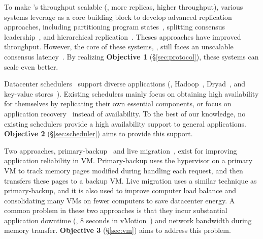 To make \paxos's throughput scalable (\ie, more replicas, higher throughput), 
various systems leverage \paxos as a core building block to develop advanced 
replication approaches, including partitioning program 
states~\cite{scatter:sosp11,ssmr:dsn14}, splitting consensus 
leadership~\cite{mencius:osdi08,spaxos:srds12}, and hierarchical 
replication~\cite{manos:hotdep10,scatter:sosp11}. Theses approaches have 
improved throughput. However, the core of these systems, 
\paxos, still faces an unscalable consensus 
latency~\cite{ellis:thesis,scatter:sosp11,manos:hotdep10}. By realizing 
\textbf{Objective 1} (\S\ref{sec:protocol}), these systems can scale even 
better.

 Datacenter
schedulers~\cite{borg:eurosys15,mesos:nsdi11,tupperware,yarn:socc13,
autopilot:sosp07,quincy:sosp09,apollo:osdi14,fuxi:vldb14} support diverse 
applications (\eg, Hadoop~\cite{hadoop}, Dryad~\cite{dryad}, and key-value 
stores~\cite{redis}). Existing schedulers mainly focus on obtaining high 
availability for themselves by replicating their own essential components, or 
focus on application recovery~\cite{fuxi:vldb14} instead of availability. 
To the best of our knowledge, no existing schedulers provide a
high availability support to general applications. \textbf{Objective 2} 
(\S\ref{sec:scheduler}) aims to provide this support.

 Two approaches, 
primary-backup~\cite{remus:nsdi08,ftvm} and live 
migration~\cite{vmotion:atc05,xen:migration:nsdi05}, exist for improving 
application reliability in VM. Primary-backup 
uses the hypervisor on a primary VM to track memory pages modified during 
handling each request, and then transfers these pages to a backup VM. Live 
migration uses a similar technique as primary-backup, and it is 
also used to improve computer load balance and consolidating many VMs on fewer 
computers to save datacenter energy. A common problem in these two approaches 
is that they incur substantial application downtime (\eg, 8 seconds 
in vMotion~\cite{vmotion:atc05}) and network bandwidth during memory transfer. 
\textbf{Objective 3} (\S\ref{sec:vm}) aims to address this problem.


